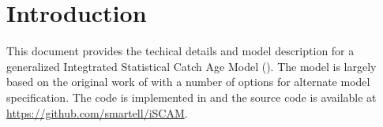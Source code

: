 

\section{Introduction} %
\label{sec:introduction}

This document provides the techical details and model description for a generalized Integtrated Statistical Catch Age Model (\iscam).  The model is largely based on the original work of \citep{fournier1982general} with a number of options for alternate model specification. The code is implemented in \admb{} and the source code is available at \url{https://github.com/smartell/iSCAM}.

